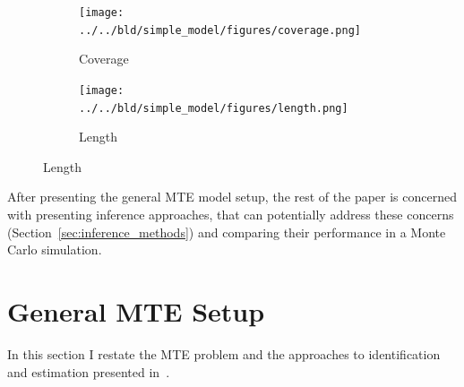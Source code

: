\documentclass[12pt,a4paper,english]{article} %
\numberwithin{equation}{section}
\theoremstyle{definition}
\theoremstyle{remark}
\theoremstyle{plain}
\begin{document}
\begin{figure}

  \caption{Monte Carlo Simulation: Simple Kink Example}\label{fig:sims_simple_model}

  \centering
  \begin{subfigure}[b]{0.49\textwidth}
      \centering
      \texttt{[image: ../../bld/simple\_model/figures/coverage.png]}
      \caption{Coverage}\label{fig:sims_simple_model_coverage}
  \end{subfigure}
  \hfill
  \begin{subfigure}[b]{0.49\textwidth}
      \centering
      \texttt{[image: ../../bld/simple\_model/figures/length.png]}
      \caption{Length}\label{fig:sims_simple_model_length}
  \end{subfigure}



\end{figure}

After presenting the general MTE model setup, the rest of the paper is concerned with presenting inference approaches, that can potentially address these concerns (Section~\ref{sec:inference_methods}) and comparing their performance in a Monte Carlo simulation.

\section{General MTE Setup}\label{sec:general_mte}
In this section I restate the MTE problem and the approaches to identification and estimation presented in~\cite{mogstad2018using}.
\end{document}
